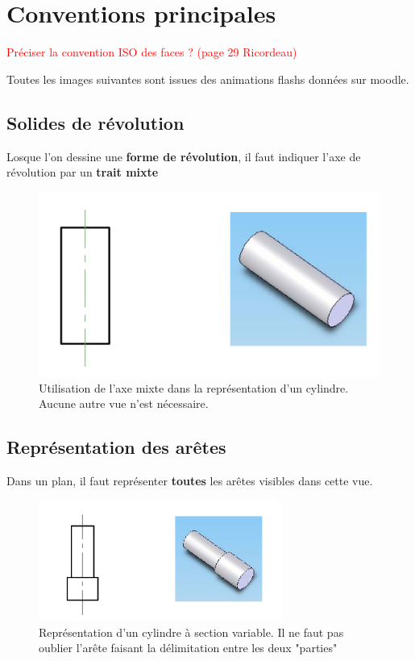 \section{Conventions principales}

\textcolor{red}{Préciser la convention ISO des faces ? (page 29 Ricordeau)}

Toutes les images suivantes sont issues des animations flashs données sur moodle.

\subsection{Solides de révolution}
Losque l'on dessine une \textbf{forme de révolution}, il faut indiquer l'axe de révolution par un \textbf{trait mixte}

\begin{figure}[H]
    \centering
    \includegraphics[width = 8 cm]{Images/ImagesDessinTechnique/axeRevolution.png}
    \caption{Utilisation de l'axe mixte dans la représentation d'un cylindre. Aucune autre vue n'est nécessaire.}
    \label{fig:my_label}
\end{figure}


\subsection{Représentation des arêtes}
Dans un plan, il faut représenter \textbf{toutes} les arêtes visibles dans cette vue.

\begin{figure}[H]
    \centering
    \includegraphics[width = 8cm]{Images/ImagesDessinTechnique/AretesCylindre.png}
    \caption{Représentation d'un cylindre à section variable. Il ne faut pas oublier l'arête faisant la délimitation entre les deux "parties"}
    \label{fig:my_label}
\end{figure}

